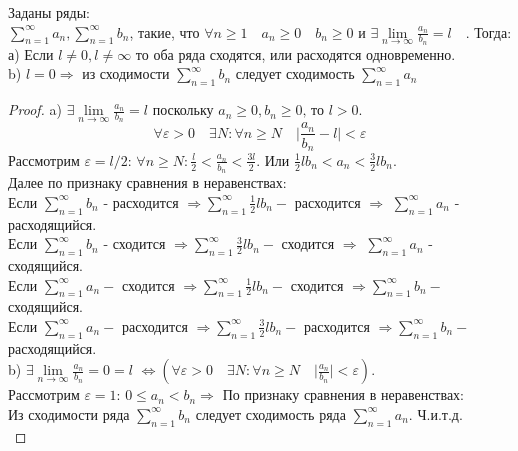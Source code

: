 \documentclass[14pt,a4paper]{scrartcl}
\theoremstyle{definition}
\theoremstyle{remark}
\theoremstyle{definition}
\theoremstyle{definition}
\begin{document}
\begin{boxteo}
Заданы ряды:\\ $ \sum\limits_{n = 1}^{ \infty}{a_n},  \sum\limits_{n = 1}^{ \infty}{b_n}  $, такие, что \quad $\forall n\geq 1\quad a_n\geq 0\quad b_n\geq 0 $ и $\exists  \displaystyle\lim\limits_{n\to  \infty}{ \frac{a_n}{b_n}  } = l\quad$.
Тогда:\\ а) Если $l \neq 0, l \neq \infty$ то оба ряда сходятся, или расходятся одновременно.\\
b) $l = 0 \Rightarrow $ из сходимости $ \sum\limits_{n = 1}^{ \infty}{b_n} $ следует сходимость $ \sum\limits_{n = 1}^{ \infty}{a_n} $

\end{boxteo}
\begin{proof}
 a) $\exists  \lim\limits_{n\to  \infty}{ \frac{a_n}{b_n}  } = l$ поскольку $a_n \geq 0, b_n \geq  0 \text{, то } l > 0$. \\
 $$\forall \varepsilon  >0 \quad \exists N : \forall n\geq N \quad \vert \frac{a_n}{b_n}  - l \vert < \varepsilon  $$
 Рассмотрим $\varepsilon = l/2$: \quad $\forall n\geq N: \frac{l}{2}  < \frac{a_n}{b_n} < \frac{3l}{2}  $. Или $ \frac{1}{2}l b_n < a_n < \frac{3}{2} l b_n  $.\\
 Далее по признаку сравнения в неравенствах:\\
 Если $ \sum\limits_{n = 1}^{ \infty}{b_n}$ - расходится $ \Longrightarrow \sum\limits_{n = 1}^{ \infty}{ \frac{1}{2}l b_n } -$ расходится $\Longrightarrow$  $ \sum\limits_{n = 1}^{ \infty}{a_n}$ - расходящийся.\\
 Если $ \sum\limits_{n = 1}^{ \infty}{b_n}$ - сходится  $\Longrightarrow \sum\limits_{n = 1}^{ \infty}{ \frac{3}{2}l b_n } -$ сходится $\Longrightarrow$  $ \sum\limits_{n = 1}^{ \infty}{a_n}$ - сходящийся.\\
 Если $ \sum\limits_{n = 1}^{ \infty}{a_n} -$ сходится $\Longrightarrow  \sum\limits_{n = 1}^{ \infty}{ \frac{1}{2}l b_n } - $ сходится $\Longrightarrow  \sum\limits_{n = 1}^{ \infty}{b_n} - $ сходящийся.\\
 Если $ \sum\limits_{n = 1}^{ \infty}{a_n} -$ расходится $\Longrightarrow  \sum\limits_{n = 1}^{ \infty}{ \frac{3}{2}l b_n } - $ расходится $\Longrightarrow  \sum\limits_ {n = 1}^{ \infty}{b_n} - $ расходящийся.\\
 b) $\exists  \lim\limits_{n\to  \infty}{ \frac{a_n}{b_n}  } =  0 = l$ $\Longleftrightarrow (\forall \varepsilon >0 \quad \exists N : \forall n\geq N \quad \vert \frac{a_n}{b_n}  \vert < \varepsilon  )$.\\
 Рассмотрим $\varepsilon = 1$: \quad $ 0\leq a_n < b_n \Longrightarrow $ По признаку сравнения в неравенствах:\\
  Из сходимости ряда $ \sum\limits_{n = 1}^{ \infty}{b_n}$ следует сходимость ряда $ \sum\limits_{n = 1}^{ \infty}{a_n}$. Ч.и.т.д. \\

\end{proof}
\end{document}
